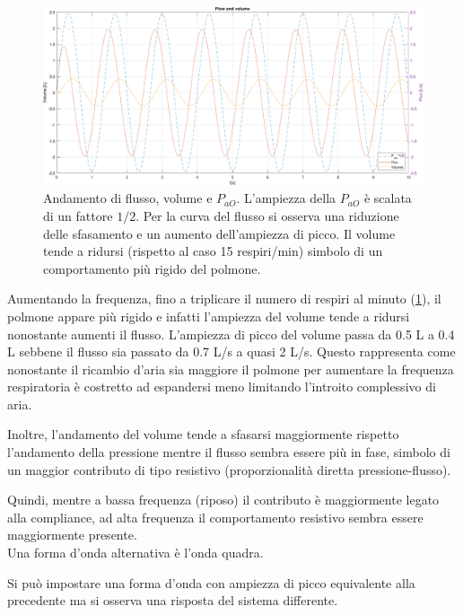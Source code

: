 \begin{figure}[t!]
\label{fig:sine_wave_15}
	\centering
\includegraphics[width=0.95\linewidth]{../model/data_log/data_sine_wave_freq_45_zoom.pdf}
\caption{Andamento di flusso, volume e $P_{aO}$. L'ampiezza della $P_{aO}$ è scalata di un fattore $1/2$. Per la curva del flusso si osserva una riduzione delle sfasamento e un aumento dell'ampiezza di picco. Il volume tende a ridursi (rispetto al caso 15 respiri/min) simbolo di un comportamento più rigido del polmone.}
\label{fig:sine_wave_45}
\end{figure}

Aumentando la frequenza, fino a triplicare il numero di respiri al minuto (\cref{fig:sine_wave_45}), il polmone appare più rigido e infatti l'ampiezza del volume tende a ridursi nonostante aumenti il flusso. L'ampiezza di picco del volume passa da 0.5 L a 0.4 L sebbene il flusso sia passato da 0.7 L/s a quasi 2 L/s. Questo rappresenta come nonostante il ricambio d'aria sia maggiore il polmone per aumentare la frequenza respiratoria è costretto ad espandersi meno limitando l'introito complessivo di aria.   

Inoltre, l'andamento del volume tende a sfasarsi maggiormente rispetto l'andamento della pressione mentre il flusso sembra essere più in fase, simbolo di un maggior contributo di tipo resistivo (proporzionalità diretta pressione-flusso).

Quindi, mentre a bassa frequenza (riposo) il contributo è maggiormente legato alla compliance, ad alta frequenza il comportamento resistivo sembra essere maggiormente presente.
\\

Una forma d'onda alternativa è l'onda quadra. 

Si può impostare una forma d'onda con ampiezza di picco equivalente alla precedente ma si osserva una risposta del sistema differente.

